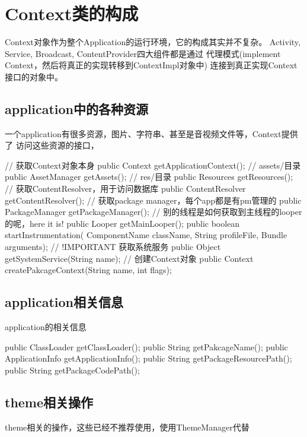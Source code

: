 ﻿
\section[Context类的构成]{Context类的构成}
Context对象作为整个Application的运行环境，它的构成其实并不复杂。
Activity, Service, Broadcast, ContentProvider四大组件都是通过
代理模式(implement Context，然后将真正的实现转移到ContextImpl对象中)
连接到真正实现Context接口的对象中。

\subsection[application中的各种资源]{application中的各种资源}
一个application有很多资源，图片、字符串、甚至是音视频文件等，Context提供了
访问这些资源的接口，

\begin{javacode}
// 获取Context对象本身
public Context getApplicationContext();
// assets/目录
public AssetManager getAssets();
// res/目录
public Resources getResources();
// 获取ContentResolver，用于访问数据库
public ContentResolver getContentResolver();
// 获取package manager，每个app都是有pm管理的
public PackageManager getPackageManager();
// 别的线程是如何获取到主线程的looper的呢，here it is!
public Looper getMainLooper();
public boolean startInstrumentation(
             ComponentName className,
             String profileFile,
             Bundle arguments);
// !IMPORTANT 获取系统服务
public Object getSystemService(String name);
// 创建Context对象
public Context createPakcageContext(String name, int flags);
\end{javacode}

\subsection[application相关信息]{application相关信息}
application的相关信息

\begin{javacode}
public ClassLoader getClassLoader();
public String getPakcageName();
public ApplicationInfo getApplicationInfo();
public String getPackageResourcePath();
public String getPackageCodePath();
\end{javacode}

\subsection[theme相关操作]{theme相关操作}
theme相关的操作，这些已经不推荐使用，使用ThemeManager代替

